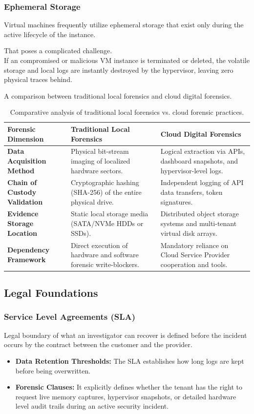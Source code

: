 \subsubsection*{Ephemeral Storage}
Virtual machines frequently utilize ephemeral storage that exist only during the active lifecycle of the instance.
\medskip

\noindent
That poses a complicated challenge.\\ 
If an compromised or malicious VM instance is terminated or deleted, the volatile storage and local logs are instantly destroyed by the hypervisor, leaving zero physical traces behind.
\bigskip

\noindent
A comparison between traditional local forensics and cloud digital forensics.
\begin{table}[H]
\centering
\small
\begin{tabular}{|p{3.5cm}|p{4.5cm}|p{4.5cm}|}
\hline
\textbf{Forensic Dimension} & \textbf{Traditional Local Forensics} & \textbf{Cloud Digital Forensics} \\
\hline
\textbf{Data Acquisition Method} & Physical bit-stream imaging of localized hardware sectors. & Logical extraction via APIs, dashboard snapshots, and hypervisor-level logs. \\
\hline
\textbf{Chain of Custody Validation} & Cryptographic hashing (SHA-256) of the entire physical drive. & Independent logging of API data transfers, token signatures.\\
\hline
\textbf{Evidence Storage Location} & Static local storage media (SATA/NVMe HDDs or SSDs). & Distributed object storage systems and multi-tenant virtual disk arrays. \\
\hline
\textbf{Dependency Framework} & Direct execution of hardware and software forensic write-blockers. & Mandatory reliance on Cloud Service Provider cooperation and tools. \\
\hline
\end{tabular}
\caption{Comparative analysis of traditional local forensics vs. cloud forensic practices.}
\end{table}


\subsection{Legal Foundations}

\subsubsection{Service Level Agreements (SLA)}
Legal boundary of what an investigator can recover is defined before the incident occurs by the contract between the customer and the provider.
\begin{itemize}
    \item \textbf{Data Retention Thresholds:} The SLA establishes how long logs are kept before being overwritten.
    \item \textbf{Forensic Clauses:} It explicitly defines whether the tenant has the right to request live memory captures, hypervisor snapshots, or detailed hardware level audit trails during an active security incident.
\end{itemize}

